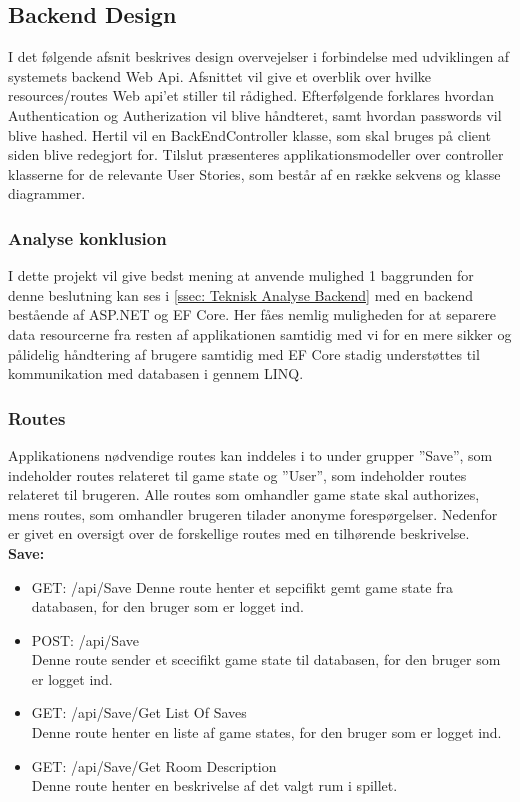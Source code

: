 \subsection{Backend Design}
\label{ssec: Backend Design}

I det følgende afsnit beskrives design overvejelser i forbindelse med udviklingen af systemets backend Web Api. Afsnittet vil give et overblik over hvilke resources/routes Web api’et stiller til rådighed. Efterfølgende forklares hvordan Authentication og Autherization vil blive håndteret, samt hvordan passwords vil blive hashed. Hertil vil en BackEndController klasse, som skal bruges på client siden blive redegjort for. Tilslut præsenteres applikationsmodeller over controller klasserne for de relevante User Stories, som består af en række sekvens og klasse diagrammer.\\

\subsubsection{Analyse konklusion}
I dette projekt vil give bedst mening at anvende mulighed 1 baggrunden for denne beslutning kan ses i \autoref{ssec: Teknisk Analyse Backend} med en backend bestående af ASP.NET og EF Core. Her fåes nemlig muligheden for at separere data resourcerne fra resten af applikationen samtidig med vi for en mere sikker og pålidelig håndtering af brugere samtidig med EF Core stadig understøttes til kommunikation med databasen i gennem LINQ. \cite{Language-Integrated-Query}\\


\subsubsection{Routes}
Applikationens nødvendige routes kan inddeles i to under grupper ”Save”, som indeholder routes relateret til game state og ”User”, som indeholder routes relateret til brugeren. Alle routes som omhandler game state skal authorizes, mens routes, som omhandler brugeren tilader anonyme forespørgelser. Nedenfor er givet en oversigt over de forskellige routes med en tilhørende beskrivelse.\\

\textbf{Save:}\\
\begin{itemize}
\item GET: /api/Save
Denne route henter et sepcifikt gemt game state fra databasen, for den bruger som er logget ind.
\item POST: /api/Save\\
Denne route sender et scecifikt game state til databasen, for den bruger som er logget ind.
\item GET: /api/Save/Get List Of Saves\\
Denne route henter en liste af game states, for den bruger som er logget ind. 
\item GET: /api/Save/Get Room Description\\
Denne route henter en beskrivelse af det valgt rum i spillet.
\end{itemize}

